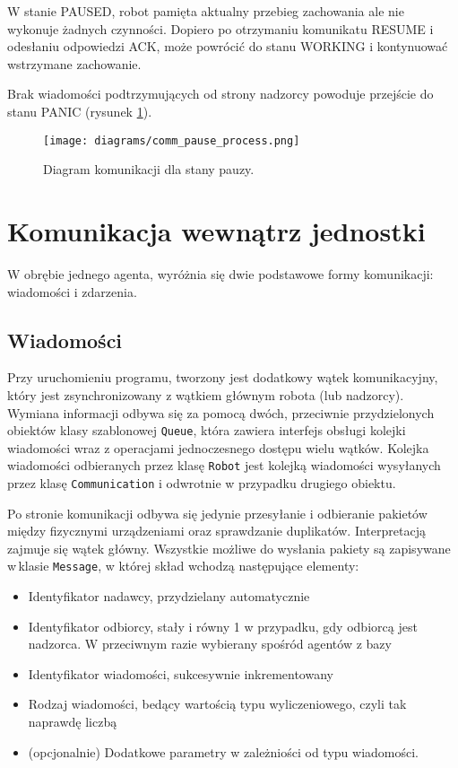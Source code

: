 W stanie PAUSED, robot pamięta aktualny przebieg zachowania ale nie wykonuje żadnych czynności. Dopiero po otrzymaniu komunikatu RESUME i odesłaniu odpowiedzi ACK, może powrócić do stanu WORKING i kontynuować wstrzymane zachowanie.

Brak wiadomości podtrzymujących od strony nadzorcy powoduje przejście do\,stanu PANIC (rysunek \ref{fig:comm_pause_process}).

\begin{figure}[!ht]
    \centering
        \texttt{[image: diagrams/comm\_pause\_process.png]}
    \caption{Diagram komunikacji dla stany pauzy.\label{fig:comm_pause_process}}
\end{figure}

\section{Komunikacja wewnątrz jednostki}

W obrębie jednego agenta, wyróżnia się dwie podstawowe formy komunikacji: wiadomości i zdarzenia.

\subsection{Wiadomości}

Przy uruchomieniu programu, tworzony jest dodatkowy wątek komunikacyjny, który jest zsynchronizowany z wątkiem głównym robota (lub nadzorcy). Wymiana informacji odbywa się za pomocą dwóch, przeciwnie przydzielonych obiektów klasy szablonowej {\tt Queue}, która zawiera interfejs obsługi kolejki wiadomości wraz z operacjami jednoczesnego dostępu wielu wątków. Kolejka wiadomości odbieranych przez klasę {\tt Robot} jest kolejką wiadomości wysyłanych przez klasę {\tt Communication} i odwrotnie w przypadku drugiego obiektu.

Po stronie komunikacji odbywa się jedynie przesyłanie i odbieranie pakietów między fizycznymi urządzeniami oraz sprawdzanie duplikatów. Interpretacją zajmuje się wątek główny. Wszystkie możliwe do wysłania pakiety są zapisywane w\,klasie {\tt Message}, w której skład wchodzą następujące elementy:
\begin{itemize}
    \item Identyfikator nadawcy, przydzielany automatycznie
    \item Identyfikator odbiorcy, stały i równy 1 w przypadku, gdy odbiorcą jest nadzorca. W przeciwnym razie wybierany spośród agentów z bazy
    \item Identyfikator wiadomości, sukcesywnie inkrementowany
    \item Rodzaj wiadomości, bedący wartością typu wyliczeniowego, czyli tak naprawdę liczbą
    \item (opcjonalnie) Dodatkowe parametry w zależniości od typu wiadomości.
\end{itemize}

